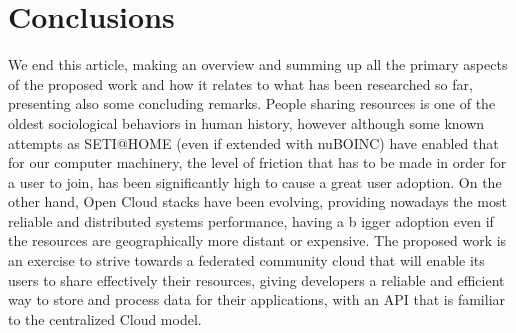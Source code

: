 
% 
% 

\section{Conclusions}

We end this article, making an overview and summing up all the primary aspects of the proposed work and how it relates to what has been researched so far, presenting also some concluding remarks.
People sharing resources is one of the oldest sociological behaviors in human history, however although some known attempts as SETI@HOME (even if extended with nuBOINC) have enabled that for our computer machinery, the level of friction that has to be made in order for a user to join, has been significantly high to cause a great user adoption. On the other hand, Open Cloud stacks have been evolving, providing nowadays the most reliable and distributed systems performance, having a b igger adoption even if the resources are geographically more distant or expensive.
The proposed work is an exercise to strive towards a federated community cloud that will enable its users to share effectively their resources, giving developers a reliable and efficient way to store and process data for their applications, with an API that is familiar to the centralized Cloud model.